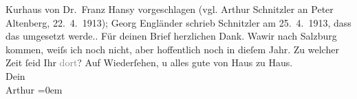 \begin{ledgroupsized}[t]{13cm}
{{{                     Kurhaus von Dr. Franz Hansy vorgeschlagen (vgl. Arthur Schnitzler an Peter Altenberg, 22. 4. 1913); Georg
                     Engländer schrieb Schnitzler am 25. 4. 1913, dass das umgesetzt
                  werde.}}}\label{K_L02132_1h}.\pend
           \pstart
           Für deinen Brief herzlichen Dank. Wa{\geminationn}{\pb}wir nach Salzburg kommen, weiſs ich noch nicht, aber hoffentlich noch in
               dieſem Jahr. Zu welcher Zeit ſeid Ihr \textcolor{gray}{dort}?\pend
           \pstart
           Auf Wiederſehen, u alles gute von Haus zu Haus.{\\[\baselineskip]}Dein{\\[\baselineskip]}\spacefill\mbox{Arthur}\pend
           \leftskip=0em{}          \endnumbering{}\end{ledgroupsized}  \newcommand{\dateiname}{L02132}\newcommand{\titel}{Arthur Schnitzler an Hermann Bahr, 2[5]. 4. 1913}\newcommand{\editorInnen}{ Kurt Ifkovits,  Martin Anton Müller}
            \footnotesize
\begin{ledgroupsized}[t]{11.5cm}
\end{ledgroupsized}
         
      